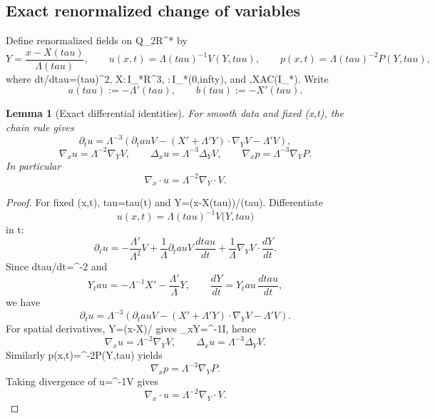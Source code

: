 \documentclass[11pt]{amsart}
\def\({}%
\def\){}%
\def\mathbb#1{#1}%
\def\tau{tau}%
\def\infty{infty}%
\theoremstyle{plain}
\newtheorem{lemma}[theorem]{Lemma}
\theoremstyle{definition}
\theoremstyle{remark}
\newcommand{\RR}{\mathbb R}
\newcommand{\nn}{\nabla}
\begin{document}
\subsection{Exact renormalized change of variables}\label{paper2:sec:change}

Define renormalized fields on \(Q_{2R}^*\) by
\[
Y=\frac{x-X(\tau)}{\Lambda(\tau)},\qquad
u(x,t)=\Lambda(\tau)^{-1}V(Y,\tau),\qquad
p(x,t)=\Lambda(\tau)^{-2}P(Y,\tau),
\]
where \(dt/d\tau=\Lambda(\tau)^2\), \(X:\,I_*\to\RR^3\), \(\Lambda:\,I_*\to(0,\infty)\),
and \(\Lambda,X\in AC(I_*)\).
Write
\[
a(\tau):=-\Lambda'(\tau),\qquad
b(\tau):=-X'(\tau).
\]

\begin{lemma}[Exact differential identities]\label{paper2:lem:change-id}
For smooth data and fixed \((x,t)\), the chain rule gives
\[
\partial_t u
=\Lambda^{-3}\left(\partial_\tau V-(X'+\Lambda' Y)\cdot\nabla_Y V-\Lambda'V\right),
\]
\[
\nn_x u=\Lambda^{-2}\nn_Y V,\qquad \Delta_x u=\Lambda^{-3}\Delta_Y V,\qquad
\nn_x p=\Lambda^{-3}\nn_Y P.
\]
In particular
\[
\nn_x\cdot u=\Lambda^{-2}\nn_Y\cdot V.
\]
\end{lemma}
\begin{proof}
For fixed \((x,t)\), \(\tau=\tau(t)\) and \(Y=(x-X(\tau))/\Lambda(\tau)\).
Differentiate
\[
u(x,t)=\Lambda(\tau)^{-1}V\bigl(Y,\tau\bigr)
\]
in \(t\):
\[
\partial_t u
=-\frac{\Lambda'}{\Lambda^2}V
+\frac1\Lambda\partial_\tau V\,\frac{d\tau}{dt}
+\frac1\Lambda\nabla_YV\cdot\frac{dY}{dt}.
\]
Since \(d\tau/dt=\Lambda^{-2}\) and
\[
Y_\tau=-\Lambda^{-1}X'-\frac{\Lambda'}{\Lambda}Y,\qquad
\frac{dY}{dt}=Y_\tau\,\frac{d\tau}{dt},
\]
we have
\[
\partial_tu
=\Lambda^{-3}\left(\partial_\tau V-(X'+\Lambda'Y)\cdot\nabla_YV-\Lambda'V\right).
\]
For spatial derivatives, \(Y=(x-X)/\Lambda\) gives \(\nabla_xY=\Lambda^{-1}I\), hence
\[
\nabla_xu=\Lambda^{-2}\nabla_YV,\qquad
\Delta_xu=\Lambda^{-3}\Delta_YV.
\]
Similarly \(p(x,t)=\Lambda^{-2}P(Y,\tau)\) yields
\[
\nabla_x p=\Lambda^{-3}\nabla_YP.
\]
Taking divergence of \(u=\Lambda^{-1}V\) gives
\[
\nabla_x\cdot u=\Lambda^{-2}\nabla_Y\cdot V.
\]
\end{proof}
\end{document}
